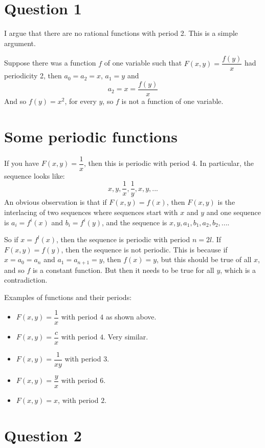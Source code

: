 \documentclass[12pt]{article}
\begin{document}
\maketitle

\section{Question 1}

I argue that there are no rational functions with period 2. This is a simple argument.

Suppose there was a function $f$ of one variable such that $F(x,y) = \dfrac{f(y)}{x}$ had periodicity 2, then $a_0 = a_2 = x$, $a_1 = y$ and
\[ a_2 = x = \dfrac{f(y)}{x} \]
And so $f(y) = x^2$, for every $y$, so $f$ is not a function of one variable. 

\section{Some periodic functions}

If you have $F(x,y) = \dfrac{1}{x}$, then this is periodic with period $4$. In particular, the sequence looks like:
\[ x, y, \dfrac{1}{x}, \dfrac{1}{y}, x, y, ... \]
An obvious observation is that if $F(x,y) = f(x)$, then $F(x,y)$ is the interlacing of two sequences where sequences start with $x$ and $y$ and one sequence is $a_i = f^{i}(x)$ and $b_i = f^{i}(y)$, and the sequence is $x,y,a_1, b_1, a_2, b_2, ...$.

So if $x = f^{l}(x)$, then the sequence is periodic with period $n = 2l$. If $F(x,y) = f(y)$, then the sequence is not periodic. This is because if $x = a_0 = a_n$ and $a_1 = a_{n+1} = y$, then $f(x) = y$, but this should be true of all $x$, and so $f$ is a constant function. But then it needs to be true for all $y$, which is a contradiction. 

Examples of functions and their periods:
\begin{itemize}
\item $F(x, y) = \dfrac{1}{x}$ with period $4$ as shown above.
\item $F(x,y) = \dfrac{c}{x}$ with period $4$. Very similar.
\item $F(x,y) = \dfrac{1}{xy}$ with period $3$.
\item $F(x,y) = \dfrac{y}{x}$ with period $6$.
\item $F(x,y) = x$, with period $2$. 
\end{itemize}

\section{Question 2}
\end{document}
